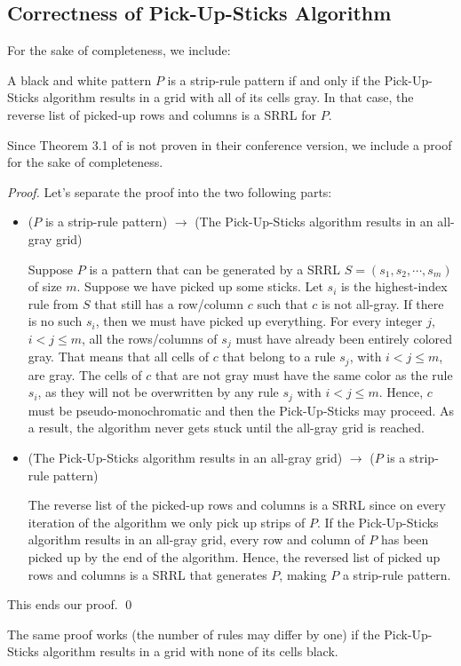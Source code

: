 \subsection{Correctness of Pick-Up-Sticks Algorithm}
\label{corr_pus}

For the sake of completeness, we include:
\begin{theorem} 
\label{theorem_pick_up_sticks}
A black and white pattern $P$ is a strip-rule pattern if and only if the Pick-Up-Sticks algorithm results in a grid with  all of its cells gray. 
In that case, the reverse list of picked-up rows 
and columns is a SRRL for $P$.
\end{theorem}

Since Theorem 3.1 of \cite{ACJKLW07} is not proven in their conference version,
we include a proof for the sake of completeness.

\begin{proof}
Let's separate the proof into the two following parts:
\begin{itemize}
\item ($P$ is a strip-rule pattern) $\rightarrow$ (The Pick-Up-Sticks algorithm results in an all-gray grid)

Suppose $P$ is a pattern that can be generated by a SRRL 
$S = (s_{1},s_{2},\cdots,s_{m})$ of size $m$.  Suppose we have picked up some
sticks.
Let $s_{i}$ is the highest-index rule from $S$ that still has a 
row/column $c$ such that $c$ is not all-gray. 
If there is no such $s_{i}$, then we must have picked up everything. 
For every integer $j$, $i < j \leq m$, 
all the rows/columns of $s_{j}$ must have already been entirely colored gray.
That means that all cells of $c$ that belong to a rule $s_{j}$, with 
$i < j \leq m$, are gray. The cells of $c$ that are not gray must have
the same color as the rule $s_{i}$, as they will not be overwritten
by any rule $s_{j}$ with $i < j \leq m$. 
Hence, $c$ must be pseudo-monochromatic and then the Pick-Up-Sticks may proceed. As a result, the algorithm never gets stuck until the all-gray grid is reached.

\item (The Pick-Up-Sticks algorithm results in an all-gray grid) $\rightarrow$ ($P$ is a strip-rule pattern) 

The reverse list of the picked-up rows and columns is a SRRL since on every iteration of the algorithm we only pick up strips of $P$. If the Pick-Up-Sticks algorithm results in an all-gray grid, every row and column of $P$ has been picked up by the end of the algorithm. Hence, the reversed list of picked up rows and columns is a SRRL that generates $P$, making $P$ a strip-rule pattern.
\end{itemize}

This ends our proof.
\qed 
\end{proof}

The same proof works (the number of rules may differ by one) if
the Pick-Up-Sticks algorithm results in a grid with none of its cells black.
